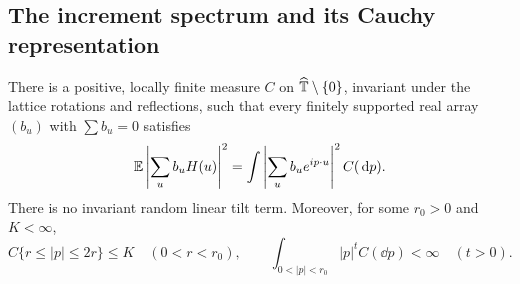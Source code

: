 \subsection{The increment spectrum and its Cauchy representation}

\begin{lemma}
\label{plane:lem:spectrum}
There is a positive, locally finite measure $C$ on
$\widehat{\mathbb T}\setminus\{0\}$, invariant under the lattice rotations and
reflections, such that every finitely supported real array $(b_u)$ with
$\sum b_u=0$ satisfies
\begin{equation}
 \label{plane:eq:spectrum}
 \mathbb E\left|\sum_u b_uH(u)\right|^2
   =\int\left|\sum_u b_ue^{ip\cdot u}\right|^2 C(\,\mathrm d p).
\end{equation}
There is no invariant random linear tilt term.  Moreover, for some
$r_0>0$ and $K<\infty$,
\begin{equation}
 \label{plane:eq:annuli}
 C\{r\le|p|\le2r\}\le K\quad(0<r<r_0),
 \qquad
 \int_{0<|p|<r_0}|p|^t C(\dd p)<\infty\quad(t>0).
\end{equation}
\end{lemma}

